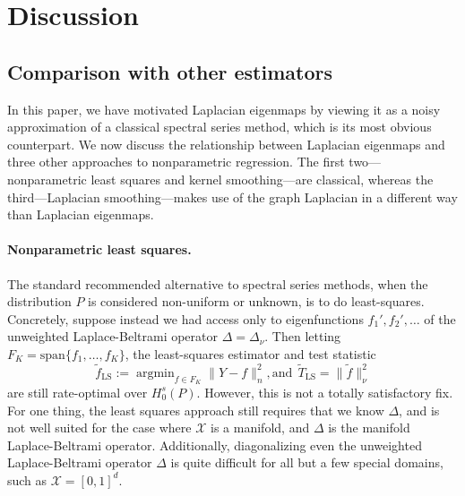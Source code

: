 \documentclass{article}
\newcommand{\1}{\mathbf{1}}
\DeclareMathOperator*{\argmin}{argmin}
\newcommand{\mc}[1]{\mathcal{#1}}
\newcommand{\wt}[1]{\widetilde{#1}}
\theoremstyle{alden}
\theoremstyle{aldenthm}
\theoremstyle{definition}
\theoremstyle{remark}
\begin{document}
\section{Discussion}
\label{sec:discussion}

\subsection{Comparison with other estimators}
In this paper, we have motivated Laplacian eigenmaps by viewing it as a noisy approximation of a classical spectral series method, which is its most obvious counterpart. We now discuss the relationship between Laplacian eigenmaps and three other approaches to nonparametric regression. The first two---nonparametric least squares and kernel smoothing---are classical, whereas the third---Laplacian smoothing---makes use of the graph Laplacian in a different way than Laplacian eigenmaps.

\paragraph{Nonparametric least squares.}
The standard recommended alternative to spectral series methods, when the distribution $P$ is considered non-uniform or unknown, is to do least-squares. Concretely, suppose instead we had access only to eigenfunctions $f_1',f_2',\ldots$ of the unweighted Laplace-Beltrami operator $\Delta = \Delta_{\nu}$. Then letting $F_K = \mathrm{span}\{f_1,\ldots,f_K\}$, the least-squares estimator and test statistic
\begin{equation*}
\wt{f}_{\mathrm{LS}} := \argmin_{f \in F_K} \|Y - f\|_n^2,\textrm{and}~~\wt{T}_{\mathrm{LS}} = \|\wt{f}\|_{\nu}^2
\end{equation*}
are still rate-optimal over $H_0^s(P)$. However, this is not a totally satisfactory fix. For one thing, the least squares approach still requires that we know $\Delta$, and is not well suited for the case where $\mc{X}$ is a manifold, and $\Delta$ is the manifold Laplace-Beltrami operator. Additionally, diagonalizing even the unweighted Laplace-Beltrami operator $\Delta$ is quite difficult for all but a few special domains, such as $\mc{X} = [0,1]^d$.
\end{document}
